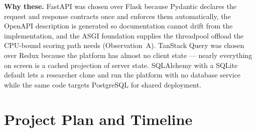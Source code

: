 \documentclass[11pt,a4paper]{article}
\begin{document}
\textbf{Why these.} FastAPI was chosen over Flask because Pydantic declares the
request and response contracts once and enforces them automatically, the OpenAPI
description is generated so documentation cannot drift from the implementation,
and the ASGI foundation supplies the threadpool offload the CPU-bound scoring
path needs (Observation~A). TanStack Query was chosen over Redux because the
platform has almost no client state --- nearly everything on screen is a cached
projection of server state. SQLAlchemy with a SQLite default lets a researcher
clone and run the platform with no database service while the same code targets
PostgreSQL for shared deployment.

\section{Project Plan and Timeline}
\end{document}
